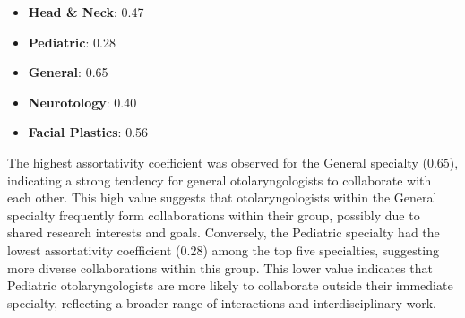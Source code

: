 \documentclass[12pt]{article}
\begin{document}
\begin{itemize}
    \item \textbf{Head \& Neck}: 0.47
    \item \textbf{Pediatric}: 0.28
    \item \textbf{General}: 0.65
    \item \textbf{Neurotology}: 0.40
    \item \textbf{Facial Plastics}: 0.56
\end{itemize}

The highest assortativity coefficient was observed for the General specialty (0.65), indicating a strong tendency for general otolaryngologists to collaborate with each other. This high value suggests that otolaryngologists within the General specialty frequently form collaborations within their group, possibly due to shared research interests and goals. Conversely, the Pediatric specialty had the lowest assortativity coefficient (0.28) among the top five specialties, suggesting more diverse collaborations within this group. This lower value indicates that Pediatric otolaryngologists are more likely to collaborate outside their immediate specialty, reflecting a broader range of interactions and interdisciplinary work.





\end{document}
